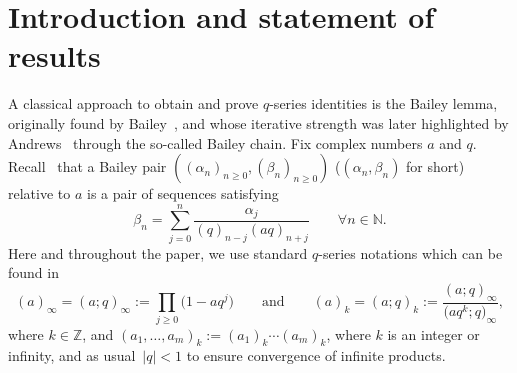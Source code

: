 \documentclass[pdftex]{sigma}
\numberwithin{equation}{section}
\newcommand{\field}[1]{\mathbb{#1}}
\newcommand{\Z}{\field{Z}}
\begin{document}


\renewcommand{\thefootnote}{\arabic{footnote}}
\setcounter{footnote}{0}

\section{Introduction and statement of results}\label{sec:intro}

A classical approach to obtain and prove $q$-series identities is the Bailey lemma, originally found by Bailey~\cite{Ba}, and whose iterative strength was later highlighted by Andrews~\cite{A1, A2, AAR} through the so-called Bailey chain.
Fix complex numbers $a$ and $q$. Recall~\cite{Ba} that a Bailey pair $((\alpha_n)_{n\geq0}, (\beta_n)_{n\geq0})$ ($(\alpha_n, \beta_n)$ for short) relative to $a$ is a pair of sequences satisfying
\begin{equation}\label{bp}
\beta_n=\sum_{j=0}^n\frac{\alpha_j}{(q)_{n-j}(aq)_{n+j}}\qquad\forall n\in\mathbb{N}.
\end{equation}
Here and throughout the paper, we use standard $q$-series notations which can be found in~\cite{GR}
\begin{equation*}
(a)_\infty = (a;q)_\infty:=\prod_{j\geq 0}\bigl(1-aq^j\bigr)\qquad\mbox{and}\qquad(a)_k = (a;q)_k:=\frac{(a;q)_\infty}{\bigl(aq^k;q\bigr)_\infty},
\end{equation*}
where $k \in \Z$, and
$
(a_1,\ldots,a_m)_k:=(a_1)_k\cdots(a_m)_k$,
where $k$ is an integer or infinity, and as usual~${|q|<1}$ to ensure convergence of infinite products.
\end{document}
